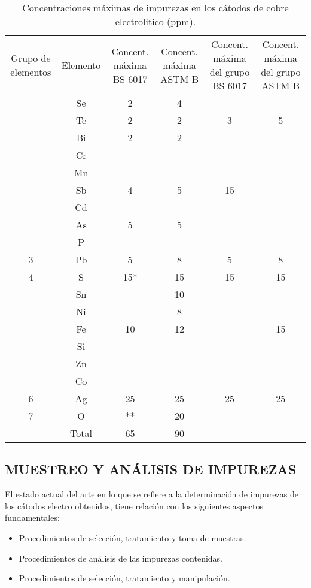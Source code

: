 \begin{table}[H]
\label{tabla6}
\begin{center}
\begin{tabular}{|c|c|c|c|c|c|}
\hline
\multirow{4}{1.5cm}{Grupo de elementos}&\multirow{4}{1.5cm}{Elemento}&\multirow{4}{1.6cm}{Concent. m\'axima BS 6017}&\multirow{4}{1.6cm}{Concent. m\'axima
ASTM  B}&\multirow{4}{2cm}{Concent. m\'axima del grupo BS 6017}&\multirow{4}{2cm}{Concent. m\'axima del grupo ASTM B}\\
 & & & & & \\
 & & & & & \\
 & & & & & \\ 
\hline
\multirow{3}{1.5cm}{\:\:\:\:\:\:\:\:1}&Se&2&4& & \\
\cline{2-6}
 &Te&2&2&3&5\\
\cline{2-6} 
 &Bi&2&2& & \\
\hline
\multirow{6}{1.5cm}{\:\:\:\:\:\:\:\:2}&Cr& & & & \\
\cline{2-6}
 &Mn& & & & \\
\cline{2-6} 
 &Sb&4&5&15& \\
 \cline{2-6}
 &Cd& & & & \\
\cline{2-6} 
 &As&5&5& & \\
 \cline{2-6}
 &P& & & & \\
\hline
3&Pb&5&8&5&8\\
\hline
4&S&15*&15&15&15\\
\hline
\multirow{6}{1.5cm}{\:\:\:\:\:\:\:\:5}&Sn& &10& & \\
\cline{2-6}
 &Ni& &8& & \\
\cline{2-6} 
 &Fe&10&12& &15 \\
 \cline{2-6}
 &Si& & & & \\
\cline{2-6} 
 &Zn& & & & \\
 \cline{2-6}
 &Co& & & & \\
\hline
6&Ag&25&25&25&25\\
\hline
7&O&**&20& & \\
\hline
 &Total&65&90& & \\
\hline
\end{tabular}
\end{center}
\caption{Concentraciones m\'aximas de impurezas en los c\'atodos de cobre electrolitico (ppm).}
\end{table}

\subsection{MUESTREO Y AN\'ALISIS DE IMPUREZAS}
El estado actual del arte en lo que se refiere a la determinaci\'on de impurezas  de los c\'atodos electro obtenidos, tiene relaci\'on con los siguientes aspectos fundamentales:
\begin{itemize}
 \item Procedimientos de selecci\'on,  tratamiento y toma de muestras.
 \item Procedimientos de an\'alisis de las impurezas contenidas.
 \item Procedimientos de selecci\'on,  tratamiento y manipulaci\'on.
\end{itemize}

